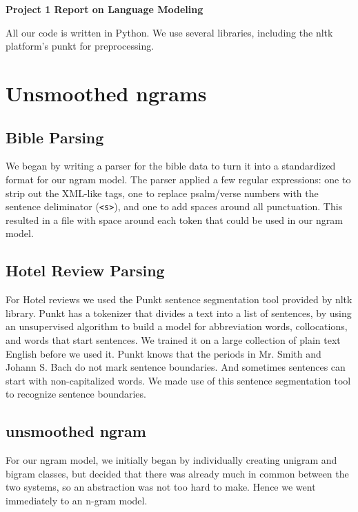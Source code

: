 \documentclass{article}
\begin{document}
\begin{center}\textbf{Project 1 Report on Language Modeling}\end{center}

All our code is written in Python. We use several libraries, including the nltk platform's punkt for preprocessing.\par

\section{Unsmoothed ngrams}

\subsection{Bible Parsing}

We began by writing a parser for the bible data to turn it into a standardized format for our ngram model. The parser applied a few regular expressions: one to strip out the XML-like tags, one to replace psalm/verse numbers with the sentence deliminator (\texttt{<s>}), and one to add spaces around all punctuation. This resulted in a file with space around each token that could be used in our ngram model. 

\subsection{Hotel Review Parsing} %

For Hotel reviews we used the Punkt sentence segmentation tool provided by nltk library. Punkt has a tokenizer that divides a text into a list of sentences, by using an unsupervised algorithm to build a model for abbreviation words, collocations, and words that start sentences. We trained it on a large collection of plain text English before we used it. Punkt knows that the periods in Mr. Smith and Johann S. Bach do not mark sentence boundaries. And sometimes sentences can start with non-capitalized words. We made use of this sentence segmentation tool to recognize sentence boundaries. 

\subsection{unsmoothed ngram}

For our ngram model, we initially began by individually creating unigram and bigram classes, but decided that there was already much in common between the two systems, so an abstraction was not too hard to make. Hence we went immediately to an n-gram model. 
\end{document}
